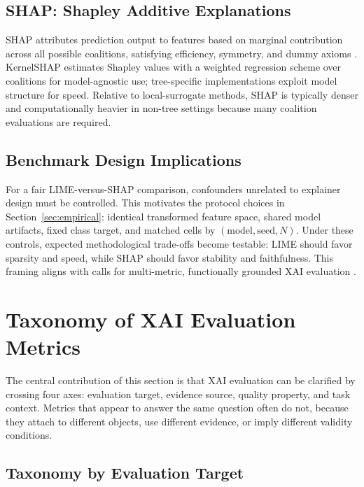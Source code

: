\documentclass[twoside,11pt]{article}
\begin{document}
\subsection{SHAP: Shapley Additive Explanations}

SHAP attributes prediction output to features based on marginal
contribution across all possible coalitions, satisfying efficiency,
symmetry, and dummy axioms \citep{lundberg2017unified}. KernelSHAP
estimates Shapley values with a weighted regression scheme over coalitions
for model-agnostic use; tree-specific implementations exploit model
structure for speed. Relative to local-surrogate methods, SHAP is
typically denser and computationally heavier in non-tree settings because
many coalition evaluations are required.

\subsection{Benchmark Design Implications}

For a fair LIME-versus-SHAP comparison, confounders unrelated to explainer
design must be controlled. This motivates the protocol choices in
Section~\ref{sec:empirical}: identical transformed feature space, shared
model artifacts, fixed class target, and matched cells by
$(\mathrm{model}, \mathrm{seed}, N)$. Under these controls, expected
methodological trade-offs become testable: LIME should favor sparsity and
speed, while SHAP should favor stability and faithfulness. This framing
aligns with calls for multi-metric, functionally grounded XAI evaluation
\citep{pawlicki2024metrics,canha2025benchmark}.

\section{Taxonomy of XAI Evaluation Metrics}
\label{sec:taxonomy}

The central contribution of this section is that XAI evaluation can be
clarified by crossing four axes: evaluation target, evidence source,
quality property, and task context. Metrics that appear to answer the
same question often do not, because they attach to different objects, use
different evidence, or imply different validity conditions.

\subsection{Taxonomy by Evaluation Target}
\end{document}
